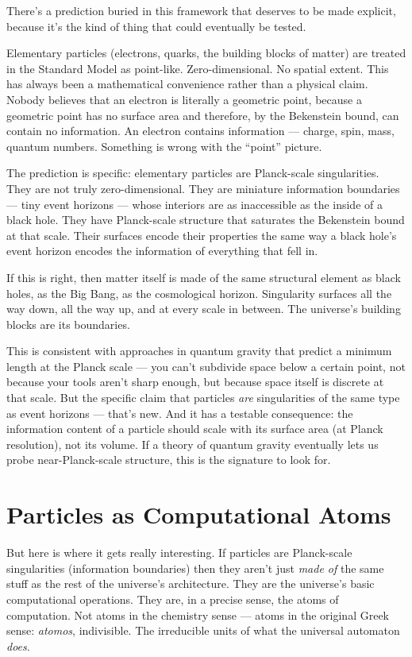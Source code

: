 \documentclass[11pt, twoside, openright]{book}
\begin{document}
There's a prediction buried in this framework that deserves to be made explicit, because it's the kind of thing that could eventually be tested.

Elementary particles (electrons, quarks, the building blocks of matter) are treated in the Standard Model as point-like. Zero-dimensional. No spatial extent. This has always been a mathematical convenience rather than a physical claim. Nobody believes that an electron is literally a geometric point, because a geometric point has no surface area and therefore, by the Bekenstein bound, can contain no information. An electron contains information --- charge, spin, mass, quantum numbers. Something is wrong with the ``point'' picture.

The prediction is specific: elementary particles are Planck-scale singularities. They are not truly zero-dimensional. They are miniature information boundaries --- tiny event horizons --- whose interiors are as inaccessible as the inside of a black hole. They have Planck-scale structure that saturates the Bekenstein bound at that scale. Their surfaces encode their properties the same way a black hole's event horizon encodes the information of everything that fell in.

If this is right, then matter itself is made of the same structural element as black holes, as the Big Bang, as the cosmological horizon. Singularity surfaces all the way down, all the way up, and at every scale in between. The universe's building blocks are its boundaries.

This is consistent with approaches in quantum gravity that predict a minimum length at the Planck scale --- you can't subdivide space below a certain point, not because your tools aren't sharp enough, but because space itself is discrete at that scale. But the specific claim that particles \textit{are} singularities of the same type as event horizons --- that's new. And it has a testable consequence: the information content of a particle should scale with its surface area (at Planck resolution), not its volume. If a theory of quantum gravity eventually lets us probe near-Planck-scale structure, this is the signature to look for.

\section*{Particles as Computational Atoms}

But here is where it gets really interesting. If particles are Planck-scale singularities (information boundaries) then they aren't just \textit{made of} the same stuff as the rest of the universe's architecture. They are the universe's basic computational operations. They are, in a precise sense, the atoms of computation. Not atoms in the chemistry sense --- atoms in the original Greek sense: \textit{atomos}, indivisible. The irreducible units of what the universal automaton \textit{does}.
\end{document}
